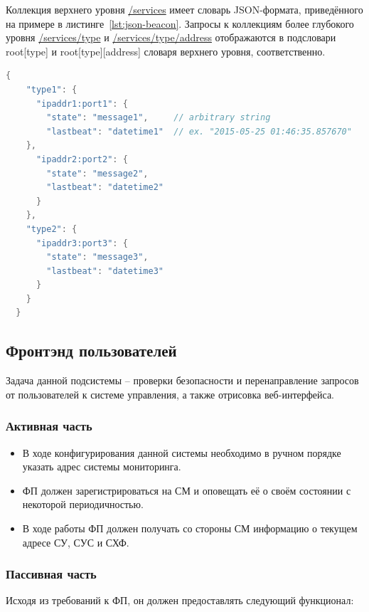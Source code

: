 \documentclass[a4paper,12pt]{report}
\numberwithin{equation}{section}
\begin{document}
  Коллекция верхнего уровня \url{/services} имеет словарь JSON-формата, приведённого на примере в листинге~\ref{lst:json-beacon}. Запросы к коллекциям более глубокого уровня \url{/services/type} и \url{/services/type/address} отображаются в подсловари root[type] и root[type][address] словаря верхнего уровня, соответственно.
  
  \begin{lstlisting}[float={},language=Java,caption={Пример JSON-представления коллекции верхнего уровня сервиса мониторинга},label=lst:json-beacon]
  {
    "type1": {
      "ipaddr1:port1": {
        "state": "message1",     // arbitrary string
        "lastbeat": "datetime1"  // ex. "2015-05-25 01:46:35.857670"
    },
      "ipaddr2:port2": {
        "state": "message2",
        "lastbeat": "datetime2"
      }
    },
    "type2": {
      "ipaddr3:port3": {
        "state": "message3",
        "lastbeat": "datetime3"
      }
    }
  }
  \end{lstlisting}
  
  \subsection{Фронтэнд пользователей}
  Задача данной подсистемы -- проверки безопасности и перенаправление запросов от пользователей к системе управления, а также отрисовка веб-интерфейса.
  
  \subsubsection{Активная часть}
  \begin{itemize}
    \item В ходе конфигурирования данной системы необходимо в ручном порядке указать адрес системы мониторинга.
    \item ФП должен зарегистрироваться на СМ и оповещать её о своём состоянии с некоторой периодичностью.
    \item В ходе работы ФП должен получать со стороны СМ информацию о текущем адресе СУ, СУС и СХФ.
  \end{itemize}
  
  \subsubsection{Пассивная часть}
  Исходя из требований к ФП, он должен предоставлять следующий функционал:
  
\end{document}
